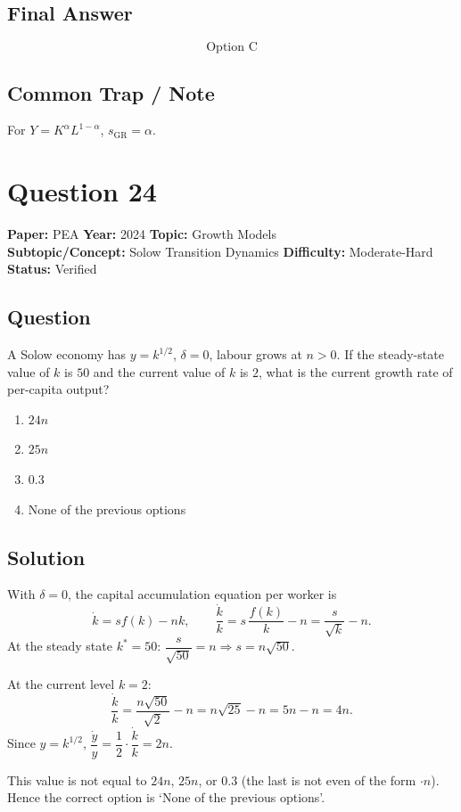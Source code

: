\documentclass[11pt]{article}
\begin{document}
\subsection*{Final Answer}
\[
\boxed{\text{Option C}}
\]

\subsection*{Common Trap / Note}
For $Y=K^{\alpha}L^{1-\alpha}$, $s_{\text{GR}}=\alpha$.

\section*{Question 24}
\textbf{Paper:} PEA \quad \textbf{Year:} 2024 \quad \textbf{Topic:} Growth Models \\
\textbf{Subtopic/Concept:} Solow Transition Dynamics \quad \textbf{Difficulty:} Moderate-Hard \quad \textbf{Status:} Verified

\subsection*{Question}
A Solow economy has $y=k^{1/2}$, $\delta=0$, labour grows at $n>0$. If the steady-state value of $k$ is $50$ and the current value of $k$ is $2$, what is the current growth rate of per-capita output?
\begin{enumerate}[label=(\Alph*)]
\item $24n$
\item $25n$
\item $0.3$
\item None of the previous options
\end{enumerate}

\subsection*{Solution}
With $\delta=0$, the capital accumulation equation per worker is
\[
\dot k = sf(k)-nk,\qquad \frac{\dot k}{k}=s\,\frac{f(k)}{k}-n=\frac{s}{\sqrt{k}}-n.
\]
At the steady state $k^{*}=50$: $\dfrac{s}{\sqrt{50}}=n\Rightarrow s=n\sqrt{50}$.

At the current level $k=2$:
\[
\frac{\dot k}{k}=\frac{n\sqrt{50}}{\sqrt{2}}-n=n\sqrt{25}-n=5n-n=4n.
\]
Since $y=k^{1/2}$, $\dfrac{\dot y}{y}=\dfrac{1}{2}\cdot\dfrac{\dot k}{k}=2n$.

This value is not equal to $24n$, $25n$, or $0.3$ (the last is not even of the form $\cdot n$). Hence the correct option is `None of the previous options'.
\end{document}
